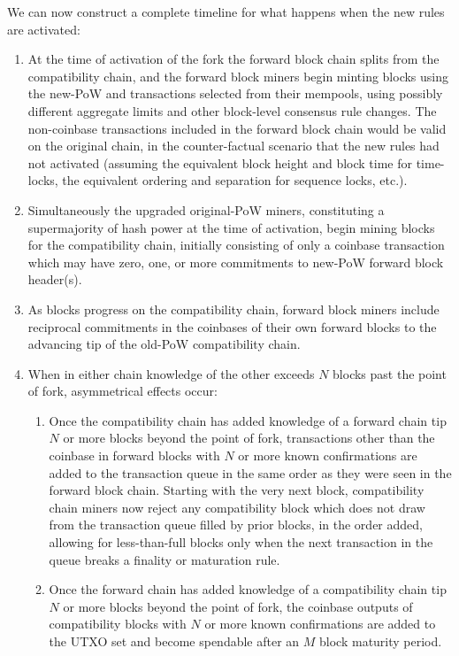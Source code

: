 We can now construct a complete timeline for what happens when the new
rules are activated:

\begin{enumerate}
  \item
    At the time of activation of the fork the forward block chain
    splits from the compatibility chain, and the forward block miners
    begin minting blocks using the new-PoW and transactions selected
    from their mempools, using possibly different aggregate limits and
    other block-level consensus rule changes.  The non-coinbase
    transactions included in the forward block chain would be valid on
    the original chain, in the counter-factual scenario that the new
    rules had not activated (assuming the equivalent block height and
    block time for time-locks, the equivalent ordering and separation
    for sequence locks, etc.).

  \item
    Simultaneously the upgraded original-PoW miners, constituting a
    supermajority of hash power at the time of activation, begin
    mining blocks for the compatibility chain, initially consisting of
    only a coinbase transaction which may have zero, one, or more
    commitments to new-PoW forward block header(s).

  \item
    As blocks progress on the compatibility chain, forward block
    miners include reciprocal commitments in the coinbases of their
    own forward blocks to the advancing tip of the old-PoW
    compatibility chain.

  \item
    When in either chain knowledge of the other exceeds $N$ blocks
    past the point of fork, asymmetrical effects occur:

    \begin{enumerate}
      \item
        Once the compatibility chain has added knowledge of a forward
        chain tip $N$ or more blocks beyond the point of fork,
        transactions other than the coinbase in forward blocks with
        $N$ or more known confirmations are added to the transaction
        queue in the same order as they were seen in the forward block
        chain.  Starting with the very next block, compatibility chain
        miners now reject any compatibility block which does not draw
        from the transaction queue filled by prior blocks, in the
        order added, allowing for less-than-full blocks only when the
        next transaction in the queue breaks a finality or maturation
        rule.

      \item
        Once the forward chain has added knowledge of a compatibility
        chain tip $N$ or more blocks beyond the point of fork, the
        coinbase outputs of compatibility blocks with $N$ or more
        known confirmations are added to the UTXO set and become
        spendable after an $M$ block maturity period.
    \end{enumerate}
\end{enumerate}

